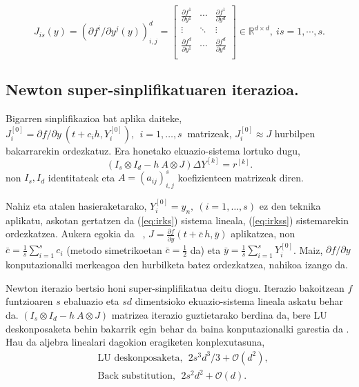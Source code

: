 \begin{equation*}
\label{eq:807}
J_{is}(y)=\left(\partial f^i/\partial y^j (y)\right)_{i,j}^d=
\begin{bmatrix}
    \frac{\partial f^1}{\partial y^1} & \cdots & \frac{\partial f^1}{\partial y^d}\\    
    \vdots & \ddots & \vdots \\    
    \frac{\partial f^d}{\partial y^1} & \cdots & \frac{\partial f^d}{\partial y^d}\\    
\end{bmatrix} \in \mathbb{R}^{d \times d},\ is=1,\cdots,s.
\end{equation*}

\subsection*{Newton super-sinplifikatuaren iterazioa.}

Bigarren sinplifikazioa bat aplika daiteke, $J_i^{[0]}=\partial f / \partial y \ (t+c_ih, Y_i^{[0]}), \ \  i=1,\dots,s \ $ matrizeak,  $J_i^{[0]} \approx J$ hurbilpen bakarrarekin ordezkatuz. Era honetako ekuazio-sistema lortuko dugu, 
\begin{equation}
\label{eq:irkss}
(I_s \otimes I_d - h \ A \otimes J) \Delta Y^{[k]} = r^{[k]}.
\end{equation}
non $I_s,I_d$ identitateak eta $A=(a_{ij})_{i,j}^s$ koefizienteen matrizeak diren.

Nahiz eta atalen hasieraketarako, $Y_i^{[0]}=y_n, \ (i=1,\dots,s)$  ez den teknika aplikatu, askotan gertatzen da (\ref{eq:irks}) sistema lineala, (\ref{eq:irkss}) sistemarekin ordezkatzea. Aukera egokia da ~\cite{Xie2009},  $J=  \frac{\partial f}{\partial y}(t+\bar c \, h,\bar y)$ aplikatzea, non $\bar c = \frac{1}{s} \sum_{i=1}^{s}c_i$ (metodo simetrikoetan $\bar c = \frac12$ da)  eta  $\bar y =  \frac{1}{s} \sum_{i=1}^{s}Y_i^{[0]}$. Maiz, $\partial f/\partial y$  konputazionalki merkeagoa den hurbilketa batez ordezkatzea, nahikoa izango da.      

Newton iterazio bertsio honi super-sinplifikatua deitu diogu. Iterazio bakoitzean $f$ funtzioaren $s$ ebaluazio eta $sd$ dimentsioko ekuazio-sistema lineala askatu behar da. $(I_s \otimes I_d - h \ A \otimes J)$ matrizea iterazio guztietarako berdina da,  bere LU deskonposaketa behin bakarrik egin behar da baina konputazionalki garestia da \cite{Butcher1976,Hairer1996}. Hau da aljebra linealari dagokion eragiketen konplexutasuna,
\begin{align*}
&\text{LU deskonposaketa}, \ \ 2s^3d^3/3+\mathcal{O}(d^2), \\
&\text{Back substitution}, \ \ 2s^2d^2+\mathcal{O}(d).
\end{align*}

